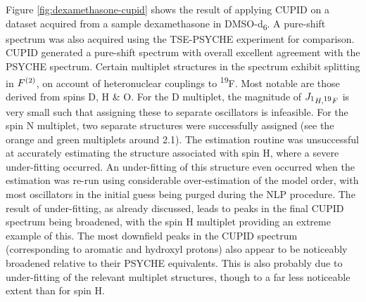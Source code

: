 Figure \ref{fig:dexamethasone-cupid} shows the result of applying CUPID on a
dataset acquired from a sample dexamethasone in DMSO-d\textsubscript{6}. A
pure-shift spectrum was also acquired using the
\ac{TSE-PSYCHE} experiment\cite{Foroozandeh2018,Foroozandeh2015} for
comparison.
\ac{CUPID} generated a pure-shift spectrum with overall excellent agreement
with the PSYCHE spectrum. Certain multiplet structures in the spectrum exhibit
splitting in $F^{(2)}$, on account of heteronuclear couplings to \textsuperscript{19}F. Most
notable are those derived from spins D, H \& O. For the D multiplet, the
magnitude of $J_{\textsuperscript{1}H,\textsuperscript{19}F}$ is very small
such that assigning these to separate oscillators is infeasible.
For the spin N multiplet, two separate structures were successfully assigned
(see the orange and green multiplets around \qty{2.1}{\partspermillion}).
The estimation routine was unsuccessful at accurately estimating the structure
associated with spin H, where a severe under-fitting occurred. An under-fitting
of this structure even occurred when the estimation was re-run using
considerable over-estimation of the model order, with most oscillators in the
initial guess being purged during the \ac{NLP} procedure. The result of
under-fitting, as already discussed, leads to peaks in the final \ac{CUPID}
spectrum being broadened, with the spin H multiplet providing an extreme
example of this. The most downfield peaks in the CUPID spectrum (corresponding
to aromatic and hydroxyl protons) also appear to be noticeably broadened
relative to their PSYCHE equivalents. This is also probably due to
under-fitting of the relevant multiplet structures, though to a far less
noticeable extent than for spin H. 

